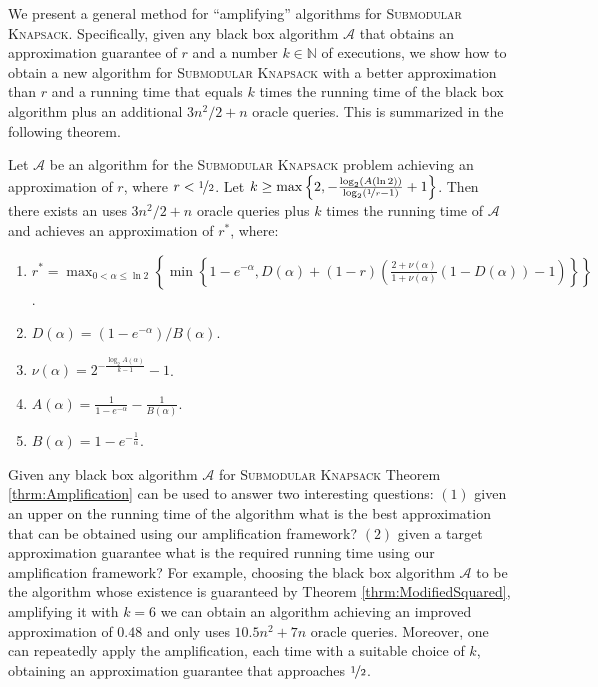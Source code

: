 \documentclass[a4paper,UKenglish,cleveref, autoref]{lipics-v2019}
\newcommand{\SK}{{\textsc{Submodular Knapsack}}\xspace}
\begin{document}
 We present a general method for ``amplifying'' algorithms for \SK.
Specifically, given any black box algorithm $\mathcal{A}$ that obtains an approximation guarantee of $r$ and a number $k\in \mathbb{N}$ of executions, we show how to obtain a new algorithm for \SK with a better approximation than $r$ and a running time that equals $k$ times the running time of the black box algorithm plus an additional  $3n^2/2+n$ oracle queries.
This is summarized in the following theorem.
\begin{theorem}\label{thrm:Amplification}
Let $\mathcal{A}$ be an algorithm for the \SK problem achieving an approximation of $r$, where $r< \nicefrac[]{1}{2}$.
Let $k\geq \max \left\{2, -\frac{\log_2(A(\ln 2))}{\log_2(\nicefrac[]{1}{r} -1 ) }+1 \right\}$.
Then there exists an uses $3n^2/2+n$ oracle queries plus $k$ times the running time of $\mathcal{A}$ and achieves an approximation of $r^*$, where:
\begin{enumerate}
\item $r^* = \max _{0< \alpha \leq \ln{2}} \left\{ \min \left\{ 1-e^{-\alpha},D(\alpha)+(1-r)\left( \frac{2+\nu(\alpha)}{1+\nu(\alpha)} (1-D(\alpha)) -1\right)\right\}\right\}$.
\item $ D(\alpha)=(1-e^{-\alpha})/B(\alpha)$.
\item $\nu(\alpha ) = 2^{-\frac{\log _2 {A(\alpha)}}{k-1}}-1$.
\item $ A(\alpha) = \frac{1}{1-e^{-\alpha}}-\frac{1}{B(\alpha)}$.
\item $ B(\alpha)=1-e^{-\frac{1}{\alpha}}$.
\end{enumerate}
\end{theorem}

Given any black box algorithm $\mathcal{A}$ for \SK Theorem \ref{thrm:Amplification} can be used to answer two interesting questions: $(1)$ given an upper on the running time of the algorithm what is the best approximation that can be obtained using our amplification framework? $(2)$ given a target approximation guarantee what is the required running time using our amplification framework?
For example, choosing the black box algorithm $\mathcal{A}$ to be the algorithm whose existence is guaranteed by Theorem \ref{thrm:ModifiedSquared}, amplifying it with $k=6$ we can obtain an algorithm achieving an improved approximation of $0.48$ and only uses  $10.5n^2+7n$ oracle queries.
Moreover, one can repeatedly apply the amplification, each time with a suitable choice of $k$, obtaining an approximation guarantee that approaches $\nicefrac[]{1}{2}$.
\end{document}
